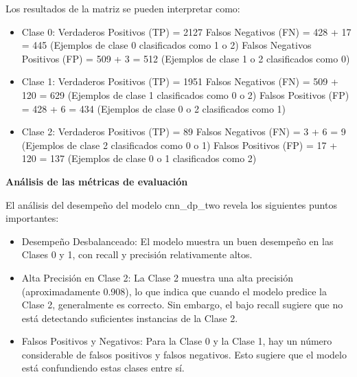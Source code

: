 Los resultados de la matriz se pueden interpretar como:

\begin{itemize}

\item Clase 0:
Verdaderos Positivos (TP) = 2127
Falsos Negativos  (FN) = 428 + 17 = 445 (Ejemplos de clase 0 clasificados como 1 o 2)
Falsos Negativos Positivos (FP) = 509 + 3 = 512 (Ejemplos de clase 1 o 2 clasificados como 0)


\item Clase 1:
Verdaderos Positivos (TP) = 1951
Falsos Negativos (FN) = 509 + 120 = 629 (Ejemplos de clase 1 clasificados como 0 o 2)
Falsos Positivos (FP) = 428 + 6 = 434 (Ejemplos de clase 0 o 2 clasificados como 1)

\item Clase 2:
Verdaderos Positivos (TP) = 89
Falsos Negativos (FN) = 3 + 6 = 9 (Ejemplos de clase 2 clasificados como 0 o 1)
Falsos Positivos (FP) = 17 + 120 = 137 (Ejemplos de clase 0 o 1 clasificados como 2)

\end{itemize}

\textbf{Análisis de las métricas de evaluación}

El análisis del desempeño del modelo cnn\_dp\_two revela los siguientes puntos importantes:

\begin{itemize}

\item Desempeño Desbalanceado:
El modelo muestra un buen desempeño en las Clases 0 y 1, con recall y precisión relativamente altos. 

\item Alta Precisión en Clase 2:
La Clase 2 muestra una alta precisión (aproximadamente 0.908), lo que indica que cuando el modelo predice la Clase 2, generalmente es correcto. Sin embargo, el bajo recall sugiere que no está detectando suficientes instancias de la Clase 2.

\item Falsos Positivos y Negativos:
Para la Clase 0 y la Clase 1, hay un número considerable de falsos positivos y falsos negativos. Esto sugiere que el modelo está confundiendo estas clases entre sí.


\end{itemize}

